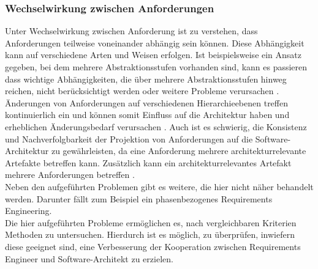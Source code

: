 \subsubsection{Wechselwirkung zwischen Anforderungen}
Unter Wechselwirkung zwischen Anforderung ist zu verstehen, dass Anforderungen teilweise voneinander abh\"angig sein k\"onnen. Diese Abh\"angigkeit kann auf verschiedene Arten und Weisen erfolgen. Ist beispielsweise ein Ansatz gegeben, bei dem mehrere Abstraktionsstufen vorhanden sind, kann es passieren dass wichtige Abh\"angigkeiten, die \"uber mehrere Abstraktionsstufen hinweg reichen, nicht ber\"ucksichtigt werden oder weitere Probleme verursachen \cite{Sik01}. \"Anderungen von Anforderungen auf verschiedenen Hierarchieebenen treffen kontinuierlich ein und k\"onnen somit Einfluss auf die Architektur haben und erheblichen \"Anderungsbedarf verursachen \cite{Zor01}. Auch ist es schwierig, die Konsistenz und Nachverfolgbarkeit der Projektion von Anforderungen auf die Software-Architektur zu gew\"ahrleisten, da eine Anforderung mehrere architekturrelevante Artefakte betreffen kann. Zus\"atzlich kann ein architekturrelevantes Artefakt mehrere Anforderungen betreffen \cite{Gru01}.\\

Neben den aufgef\"uhrten Problemen gibt es weitere, die hier nicht n\"aher behandelt werden. Darunter f\"allt zum Beispiel ein phasenbezogenes Requirements Engineering.
\\

Die hier aufgef\"uhrten Probleme erm\"oglichen es, nach vergleichbaren Kriterien Methoden zu untersuchen. Hierdurch ist es m\"oglich, zu \"uberpr\"ufen, inwiefern diese geeignet sind, eine Verbesserung der Kooperation zwischen Requirements Engineer und Software-Architekt zu erzielen. \\

